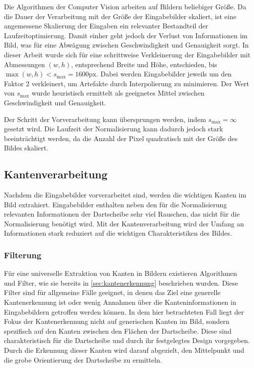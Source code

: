 Die Algorithmen der Computer Vision arbeiten auf Bildern beliebiger Größe. Da die Dauer der Verarbeitung mit der Größe der Eingabebilder skaliert, ist eine angemessene Skalierung der Eingaben ein relevanter Bestandteil der Laufzeitoptimierung. Damit einher geht jedoch der Verlust von Informationen im Bild, was für eine Abwägung zwischen Geschwindigkeit und Genauigkeit sorgt. In dieser Arbeit wurde sich für eine schrittweise Verkleinerung der Eingabebilder mit Abmessungen $(w, h)$, entsprechend Breite und Höhe, entschieden, bis $\max (w, h) < s_\text{max} = 1600\text{px}$. Dabei werden Eingabebilder jeweils um den Faktor 2 verkleinert, um Artefakte durch Interpolierung zu minimieren. Der Wert von $s_\text{max}$ wurde heuristisch ermittelt als geeignetes Mittel zwischen Geschwindigkeit und Genauigkeit.

Der Schritt der Vorverarbeitung kann übersprungen werden, indem $s_\text{max} = \infty$ gesetzt wird. Die Laufzeit der Normalisierung kann dadurch jedoch stark beeinträchtigt werden, da die Anzahl der Pixel quadratisch mit der Größe des Bildes skaliert.

\subsection{Kantenverarbeitung}
\label{sec:kanten}

Nachdem die Eingabebilder vorverarbeitet sind, werden die wichtigen Kanten im Bild extrahiert. Eingabebilder enthalten neben den für die Normalisierung relevanten Informationen der Dartscheibe sehr viel Rauschen, das nicht für die Normalisierung benötigt wird. Mit der Kantenverarbeitung wird der Umfang an Informationen stark reduziert auf die wichtigen Charakteristiken des Bildes.

\subsubsection{Filterung}
\label{sec:filterung}

Für eine universelle Extraktion von Kanten in Bildern existieren Algorithmen und Filter, wie sie bereits in \autoref{sec:kantenerkennung} beschrieben wurden. Diese Filter sind für allgemeine Fälle geeignet, in denen das Ziel eine generelle Kantenerkennung ist oder wenig Annahmen über die Kanteninformationen in Eingabebildern getroffen werden können. In dem hier betrachteten Fall liegt der Fokus der Kantenerkennung nicht auf generischen Kanten im Bild, sondern spezifisch auf den Kanten zwischen den Flächen der Dartscheibe. Diese sind charakteristisch für die Dartscheibe und durch ihr festgelegtes Design vorgegeben. Durch die Erkennung dieser Kanten wird darauf abgezielt, den Mittelpunkt und die grobe Orientierung der Dartscheibe zu ermitteln.

